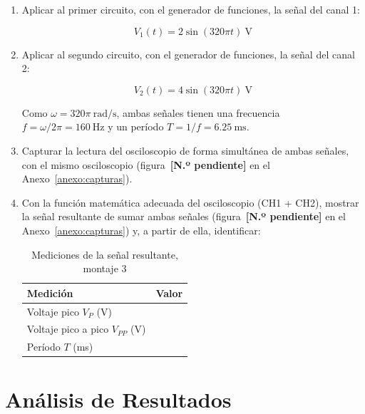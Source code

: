 \documentclass{article}
\newcommand{\vacio}[1][2cm]{\underline{\hspace{#1}}}
\newcommand{\figpend}{figura~\textbf{[N.º pendiente]}}
\begin{document}
    \begin{enumerate}
        \item Aplicar al primer circuito, con el generador de funciones, la señal del canal 1:

        \[
            V_1(t) = 2\sin(320\pi t)\ \si{\volt}
        \]

        \item Aplicar al segundo circuito, con el generador de funciones, la señal del canal 2:

        \[
            V_2(t) = 4\sin(320\pi t)\ \si{\volt}
        \]

        Como $\omega = 320\pi\ \si{\radian\per\second}$, ambas señales tienen una frecuencia $f = \omega/2\pi = \SI{160}{\hertz}$ y un período $T = 1/f = \SI{6.25}{\milli\second}$.

        \item Capturar la lectura del osciloscopio de forma simultánea de ambas señales, con el mismo osciloscopio (\figpend{} en el Anexo~\ref{anexo:capturas}).

        \item Con la función matemática adecuada del osciloscopio (CH1 + CH2), mostrar la señal resultante de sumar ambas señales (\figpend{} en el Anexo~\ref{anexo:capturas}) y, a partir de ella, identificar:

        \begin{table}[ht!]
            \centering
            \begin{tabular}{lc}
                \toprule
                Medición                         & Valor  \\
                \midrule
                Voltaje pico $V_P$ (V)           & \vacio \\
                Voltaje pico a pico $V_{PP}$ (V) & \vacio \\
                Período $T$ (ms)                 & \vacio \\
                \bottomrule
            \end{tabular}
            \caption{Mediciones de la señal resultante, montaje 3}\label{tab:osc-m3}
        \end{table}
    \end{enumerate}

    \section{Análisis de Resultados}
\end{document}
